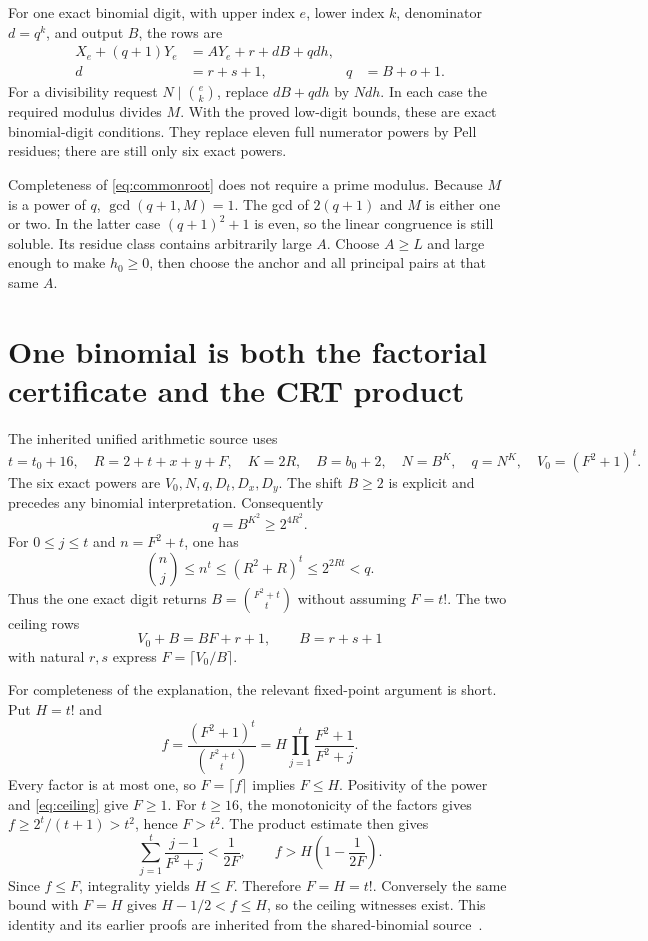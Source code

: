 \documentclass[11pt]{article}
\theoremstyle{remark}\newtheorem{remark}[theorem]{Remark}
\begin{document}
For one exact binomial digit, with upper index $e$, lower index $k$, denominator $d=q^k$, and output $B$, the rows are
\begin{align}
 X_e+(q+1)Y_e&=AY_e+r+dB+qd h,\nonumber\\
 d&=r+s+1,&q&=B+o+1.\label{eq:digit}
\end{align}
For a divisibility request $N\mid\binom{e}{k}$, replace $dB+qd h$ by $Nd h$. In each case the required modulus divides $M$. With the proved low-digit bounds, these are exact binomial-digit conditions. They replace eleven full numerator powers by Pell residues; there are still only six exact powers.

Completeness of \eqref{eq:commonroot} does not require a prime modulus. Because $M$ is a power of $q$, $\gcd(q+1,M)=1$. The gcd of $2(q+1)$ and $M$ is either one or two. In the latter case $(q+1)^2+1$ is even, so the linear congruence is still soluble. Its residue class contains arbitrarily large $A$. Choose $A\ge L$ and large enough to make $h_0\ge0$, then choose the anchor and all principal pairs at that same $A$.

\section{One binomial is both the factorial certificate and the CRT product}
\label{sec:factorial}

The inherited unified arithmetic source uses
\[
 t=t_0+16,\quad R=2+t+x+y+F,\quad K=2R,\quad B=b_0+2,
 \quad N=B^K,\quad q=N^K,\quad V_0=(F^2+1)^t.
\]
The six exact powers are $V_0,N,q,D_t,D_x,D_y$. The shift $B\ge2$ is explicit and precedes any binomial interpretation. Consequently
\[
 q=B^{K^2}\ge2^{4R^2}.
\]
For $0\le j\le t$ and $n=F^2+t$, one has
\[
 \binom nj\le n^t\le(R^2+R)^t\le2^{2Rt}<q.
\]
Thus the one exact digit returns $B=\binom{F^2+t}{t}$ without assuming $F=t!$. The two ceiling rows
\begin{equation}\label{eq:ceiling}
 V_0+B=BF+r+1,\qquad B=r+s+1
\end{equation}
with natural $r,s$ express $F=\lceil V_0/B\rceil$.

For completeness of the explanation, the relevant fixed-point argument is short. Put $H=t!$ and
\[
 f=\frac{(F^2+1)^t}{\binom{F^2+t}{t}}
   =H\prod_{j=1}^t\frac{F^2+1}{F^2+j}.
\]
Every factor is at most one, so $F=\lceil f\rceil$ implies $F\le H$. Positivity of the power and \eqref{eq:ceiling} give $F\ge1$. For $t\ge16$, the monotonicity of the factors gives $f\ge2^t/(t+1)>t^2$, hence $F>t^2$. The product estimate then gives
\[
 \sum_{j=1}^t\frac{j-1}{F^2+j}<\frac1{2F},
 \qquad f>H\left(1-\frac1{2F}\right).
\]
Since $f\le F$, integrality yields $H\le F$. Therefore $F=H=t!$. Conversely the same bound with $F=H$ gives $H-1/2<f\le H$, so the ceiling witnesses exist. This identity and its earlier proofs are inherited from the shared-binomial source~\cite{shared319}.
\end{document}
